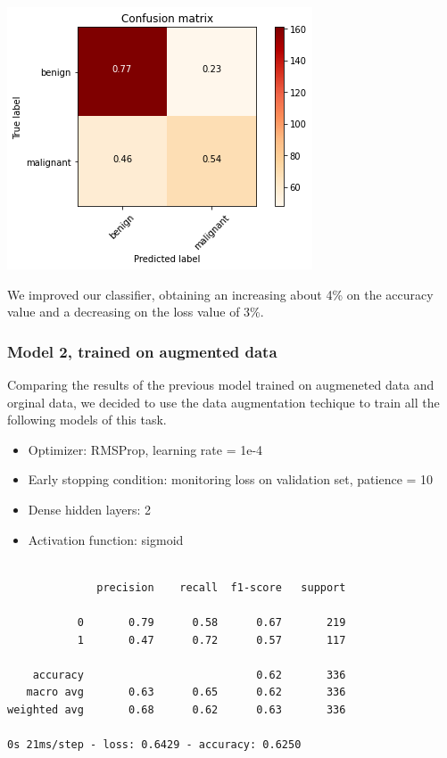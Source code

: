\documentclass{article}
\begin{document}
\begin{center}
\begin{minipage}{0.45\textwidth}
        \includegraphics[scale=0.6]{./img/cmScratch2_2.png}
    \end{minipage}
\end{center}
We improved our classifier, obtaining an increasing about 4\% on the accuracy value and a decreasing on the loss value of 3\%.




\subsubsection{Model 2, trained on augmented data}
Comparing the results of the previous model trained on augmeneted data and orginal data, we decided to use the data augmentation techique to train all the following models of this task.

\begin{itemize}
\item Optimizer: RMSProp, learning rate = 1e-4
\item Early stopping condition: monitoring loss on validation set, patience = 10
\item Dense hidden layers: 2
\item Activation function: sigmoid
\end{itemize}
\begin{verbatim}

              precision    recall  f1-score   support

           0       0.79      0.58      0.67       219
           1       0.47      0.72      0.57       117

    accuracy                           0.62       336
   macro avg       0.63      0.65      0.62       336
weighted avg       0.68      0.62      0.63       336

0s 21ms/step - loss: 0.6429 - accuracy: 0.6250

\end{verbatim}
\end{document}
